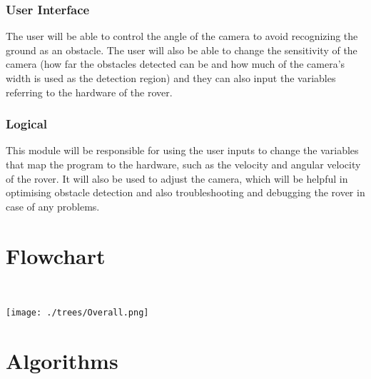 \documentclass[11pt]{report}
\begin{document}
\subsubsection{\normalfont User Interface}
The user will be able to control the angle of the camera to avoid recognizing the ground as an obstacle. The user will also be able to change the sensitivity of the camera (how far the obstacles detected can be and how much of the camera's width is used as the detection region) and they can also input the variables referring to the hardware of the rover.
\subsubsection{\normalfont Logical}
This module will be responsible for using the user inputs to change the variables that map the program to the hardware, such as the velocity and angular velocity of the rover. It will also be used to adjust the camera, which will be helpful in optimising obstacle detection and also troubleshooting and debugging the rover in case of any problems.

\newpage
\section{Flowchart}
\noindent
\\
\centerline{\texttt{[image: ./trees/Overall.png]}}

\newpage
\section{Algorithms}
\end{document}
